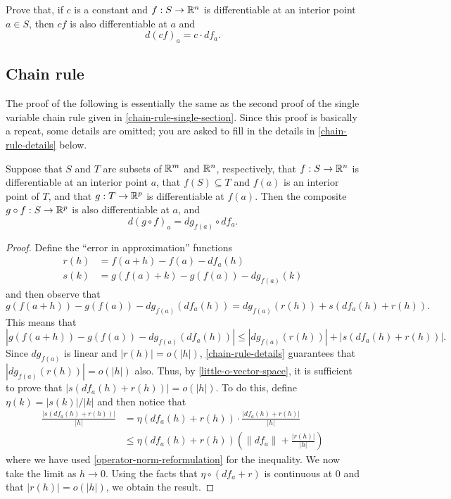 \begin{exercise} \label{scalar-multiples-rule} 
	Prove that, if $c$ is a constant and $f : S \to \mathbb{R}^n$ is differentiable at an interior point $a \in S$, then $cf$ is also differentiable at $a$ and \[ d(cf)_a = c \cdot df_a. \]
\end{exercise}

\subsection{Chain rule}

The proof of the following is essentially the same as the second proof of the single variable chain rule given in \cref{chain-rule-single-section}. Since this proof is basically a repeat, some details are omitted; you are asked to fill in the details in \cref{chain-rule-details} below. 

\begin{theorem} \label{chain-rule} 
	Suppose that $S$ and $T$ are subsets of $\mathbb{R}^m$ and $\mathbb{R}^n$, respectively, that $f : S \to \mathbb{R}^n$ is differentiable at an interior point $a$, that $f(S) \subseteq T$ and $f(a)$ is an interior point of $T$, and that $g : T \to \mathbb{R}^p$ is differentiable at $f(a)$. Then the composite $g \circ f : S \to \mathbb{R}^p$ is also differentiable at $a$, and 
	\[ d(g \circ f)_a = dg_{f(a)} \circ df_a. \]
\end{theorem}

\begin{proof}
	Define the ``error in approximation'' functions
	\[ \begin{aligned} 
	r(h) &= f(a+h)-f(a) - df_a(h) \\ 
	s(k) &= g(f(a)+k)-g(f(a))-dg_{f(a)}(k) 
	\end{aligned} \]
	and then observe that
	\begin{equation} \label{rewrite-error} g(f(a+h)) - g(f(a)) - dg_{f(a)}(df_a(h)) = dg_{f(a)}(r(h)) + s(df_a(h)+r(h)). \end{equation}
	This means that 
	\[ |g(f(a+h)) - g(f(a)) - dg_{f(a)}(df_a(h))| \leq |dg_{f(a)}(r(h))| + |s(df_a(h)+r(h))|. \]
	Since $dg_{f(a)}$ is linear and $|r(h)| = o(|h|)$, \cref{chain-rule-details} guarantees that $|dg_{f(a)}(r(h))| = o(|h|)$ also. Thus, by \cref{little-o-vector-space}, it is sufficient to prove that $|s(df_a(h) + r(h))| = o(|h|)$. To do this, define $\eta(k) = |s(k)|/|k|$ and then notice that 
	\[ \begin{aligned} \frac{|s(df_a(h)+r(h))|}{|h|} &= \eta(df_a(h)+r(h)) \cdot \frac{|df_a(h) + r(h)|}{|h|} \\
	&\leq \eta(df_a(h) + r(h)) \left( \|df_a\| + \frac{|r(h)|}{|h|} \right) \end{aligned} \]
	where we have used \cref{operator-norm-reformulation} for the inequality.
	We now take the limit as $h \to 0$. Using the facts that $\eta \circ (df_a + r)$ is continuous at 0 and that $|r(h)| = o(|h|)$, we obtain the result. 
\end{proof}

